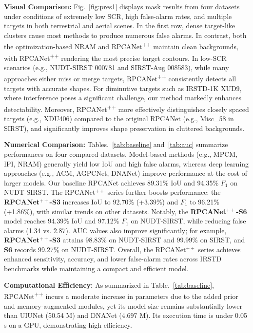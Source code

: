 \documentclass[10pt,journal,compsoc]{IEEEtran}
\begin{document}
\noindent \textbf{Visual Comparison:}
Fig.~\ref{fig:pres1} displays mask results from four datasets under conditions of extremely low SCR, high false-alarm rates, and multiple targets in both terrestrial and aerial scenes. In the first row, dense target-like clusters cause most methods to produce numerous false alarms. In contrast, both the optimization-based NRAM and RPCANet\textsuperscript{++} maintain clean backgrounds, with RPCANet\textsuperscript{++} rendering the most precise target contours. In low-SCR scenarios (e.g., NUDT-SIRST 000781 and SIRST-Aug 008583), while many approaches either miss or merge targets, RPCANet\textsuperscript{++} consistently detects all targets with accurate shapes. For diminutive targets such as IRSTD-1K XUD9, where interference poses a significant challenge, our method markedly enhances detectability. Moreover, RPCANet\textsuperscript{++} more effectively distinguishes closely spaced targets (e.g., XDU406) compared to the original RPCANet (e.g., Misc\_58 in SIRST), and significantly improves shape preservation in cluttered backgrounds.

\noindent \textbf{Numerical Comparison:}  
Tables.~\ref{tab:baseline} and~\ref{tab:auc} summarize performances on four compared datasets. Model-based methods (e.g., MPCM, IPI, NRAM) generally yield low IoU and high false alarms, whereas deep learning approaches (e.g., ACM, AGPCNet, DNANet) improve performance at the cost of larger models. Our baseline RPCANet achieves 89.31\% IoU and 94.35\% $F_1$ on NUDT-SIRST. The RPCANet$^{++}$ series further boosts performance: the \textbf{RPCANet$^{++}$-S3} increases IoU to 92.70\% (+3.39\%) and $F_1$ to 96.21\% (+1.86\%), with similar trends on other datasets. Notably, the \textbf{RPCANet$^{++}$-S6} model reaches 94.39\% IoU and 97.12\% $F_1$ on NUDT-SIRST, while reducing false alarms (1.34 vs. 2.87). AUC values also improve significantly; for example, \textbf{RPCANet$^{++}$-S3} attains 98.83\% on NUDT-SIRST and 99.99\% on SIRST, and \textbf{S6} records 99.27\% on NUDT-SIRST. Overall, the RPCANet$^{++}$ series achieves enhanced sensitivity, accuracy, and lower false-alarm rates across IRSTD benchmarks while maintaining a compact and efficient model.

\noindent \textbf{Computational Efficiency:}  
As summarized in Table.~\ref{tab:baseline}, RPCANet\textsuperscript{++} incurs a moderate increase in parameters due to the added prior and memory-augmented modules, yet its model size remains substantially lower than UIUNet (50.54 M) and DNANet (4.697 M). Its execution time is under 0.05 s on a GPU, demonstrating high efficiency.
\end{document}
